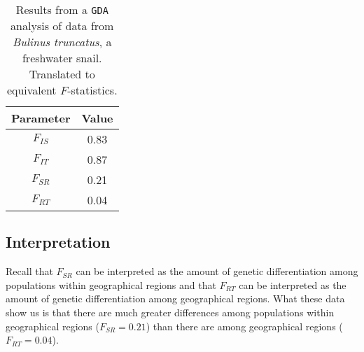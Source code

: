 \begin{table}
\begin{center}
\begin{tabular}{cc}
\hline\hline
Parameter  & Value \\
\hline
$F_{IS}$   & 0.83 \\
$F_{IT}$   & 0.87 \\
$F_{SR}$   & 0.21 \\
$F_{RT}$   & 0.04 \\
\hline
\end{tabular}
\end{center}
\caption{Results from a {\tt GDA} analysis of data from {\it Bulinus
    truncatus}, a freshwater snail. Translated to equivalent
  $F$-statistics.}\label{table:bulinus-gda} 
\end{table}

\subsection*{Interpretation}

Recall that $F_{SR}$ can be interpreted as the amount of genetic
differentiation among populations within geographical regions and that
$F_{RT}$ can be interpreted as the amount of genetic differentiation
among geographical regions. What these data show us is that there are
much greater differences among populations within geographical regions
($F_{SR}=0.21$) than there are among geographical regions
($F_{RT}=0.04$).

